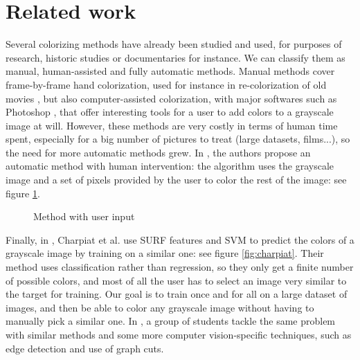 \documentclass[10pt,twocolumn]{article}
\begin{document}
\section{Related work}
Several colorizing methods have already been studied and used, for purposes of research, historic studies or documentaries for instance. We can classify them as manual, human-assisted and fully automatic methods. Manual methods cover frame-by-frame hand colorization, used for instance in re-colorization of old movies \cite{WW1Colorized}, but also computer-assisted colorization, with major softwares such as Photoshop \cite{photoshop}, that offer interesting tools for a user to add colors to a grayscale image at will. However, these methods are very costly in terms of human time spent, especially for a big number of pictures to treat (large datasets, films...), so the need for more automatic methods grew. In \cite{pap:userInput}, the authors propose an automatic method with human intervention: the algorithm uses the grayscale image and a set of pixels provided by the user to color the rest of the image: see figure \ref{fig:userInput}. 

\begin{figure}[h]
\centering
\caption{\scriptsize Method with user input}      
\label{fig:userInput}
\end{figure}

Finally, in \cite{bestPaper}, Charpiat et al. use SURF features and SVM to predict the colors of a grayscale image by training on a similar one: see figure \ref{fig:charpiat}. Their method uses classification rather than regression, so they only get a finite number of possible colors, and most of all the user has to select an image very similar to the target for training. Our goal is to train once and for all on a large dataset of images, and then be able to color any grayscale image without having to manually pick a similar one. In \cite{stanford}, a group of students tackle the same problem with similar methods and some more computer vision-specific techniques, such as edge detection and use of graph cuts.
\end{document}
